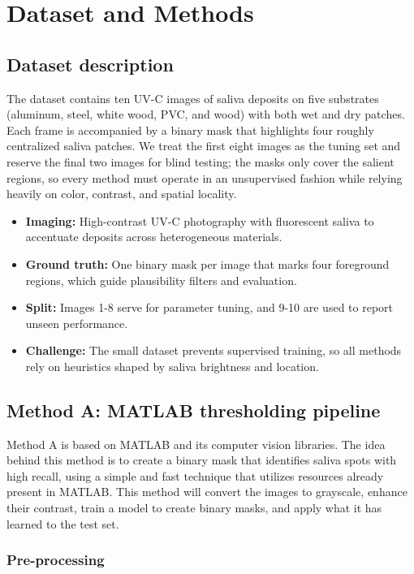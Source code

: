 \section{Dataset and Methods}

\subsection{Dataset description}

The dataset contains ten UV-C images of saliva deposits on five substrates (aluminum, steel, white wood, PVC, and wood) with both wet and dry patches. Each frame is accompanied by a binary mask that highlights four roughly centralized saliva patches. We treat the first eight images as the tuning set and reserve the final two images for blind testing; the masks only cover the salient regions, so every method must operate in an unsupervised fashion while relying heavily on color, contrast, and spatial locality.

\begin{itemize}
  \item \textbf{Imaging:} High-contrast UV-C photography with fluorescent saliva to accentuate deposits across heterogeneous materials.
  \item \textbf{Ground truth:} One binary mask per image that marks four foreground regions, which guide plausibility filters and evaluation.
  \item \textbf{Split:} Images 1-8 serve for parameter tuning, and 9-10 are used to report unseen performance.
  \item \textbf{Challenge:} The small dataset prevents supervised training, so all methods rely on heuristics shaped by saliva brightness and location.
\end{itemize}

\subsection{Method A: MATLAB thresholding pipeline}

Method A is based on MATLAB and its computer vision libraries. The idea behind this method is to create a binary mask that identifies saliva spots with high recall, using a simple and fast technique that utilizes resources already present in MATLAB. This method will convert the images to grayscale, enhance their contrast, train a model to create binary masks, and apply what it has learned to the test set.

\subsubsection{Pre-processing}

